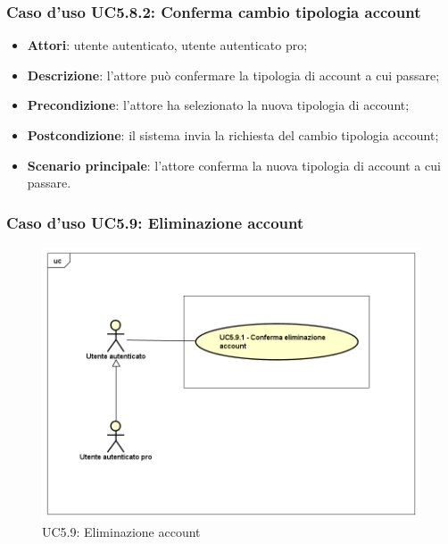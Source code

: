 \subsubsection{Caso d'uso UC5.8.2: Conferma cambio tipologia account}

\begin{itemize}
	\item \textbf{Attori}: utente autenticato, utente autenticato pro;
	\item \textbf{Descrizione}: l'attore può confermare la tipologia di account a cui passare;
	\item \textbf{Precondizione}: l'attore ha selezionato la nuova tipologia di account;
	\item \textbf{Postcondizione}: il sistema invia la richiesta del cambio tipologia account;
	\item \textbf{Scenario principale}: l'attore conferma la nuova tipologia di account a cui passare.
\end{itemize}

\subsubsection{Caso d'uso UC5.9: Eliminazione account}
\label{UC5.9}
\begin{figure}[h]
	\centering
	\includegraphics[scale=0.5,keepaspectratio]{UML/UC5_9.png}
	\caption{UC5.9: Eliminazione account}
\end{figure}


